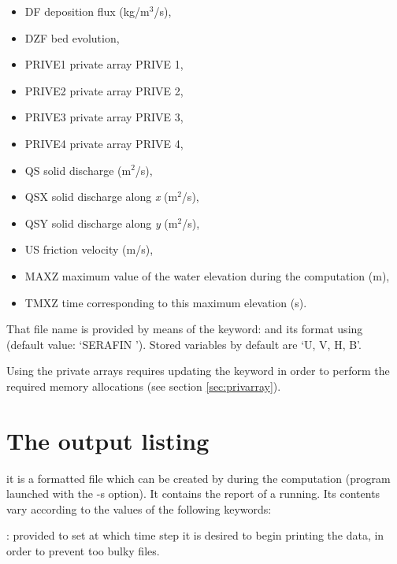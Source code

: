 \begin{itemize}
\item DF deposition flux (kg/m${}^{3}$/s),

\item DZF bed evolution,

\item PRIVE1 private array PRIVE 1,

\item PRIVE2 private array PRIVE 2,

\item PRIVE3 private array PRIVE 3,

\item PRIVE4 private array PRIVE 4,

\item QS  solid discharge (m${}^{2}$/s),

\item QSX  solid discharge along \textit{x} (m${}^{2}$/s),

\item QSY  solid discharge along \textit{y} (m${}^{2}$/s),

\item US  friction velocity (m/s),

\item MAXZ  maximum value of the water elevation during the computation (m),

\item TMXZ  time corresponding to this maximum elevation (s).
\end{itemize}

That file name is provided by means of the keyword:  and
its format using  (default value: `SERAFIN ').
Stored variables by default are `U, V, H, B'.

Using the private arrays requires updating the keyword  in order to perform the required memory allocations (see
section \ref{sec:privarray}).

\section{The output listing}

it is a formatted file which can be created by  during the
computation (program launched with the -s option). It contains the report of a
 running. Its contents vary according to the values of the following
keywords:

: provided to set at
which time step it is desired to begin printing the data, in order to prevent
too bulky files.


